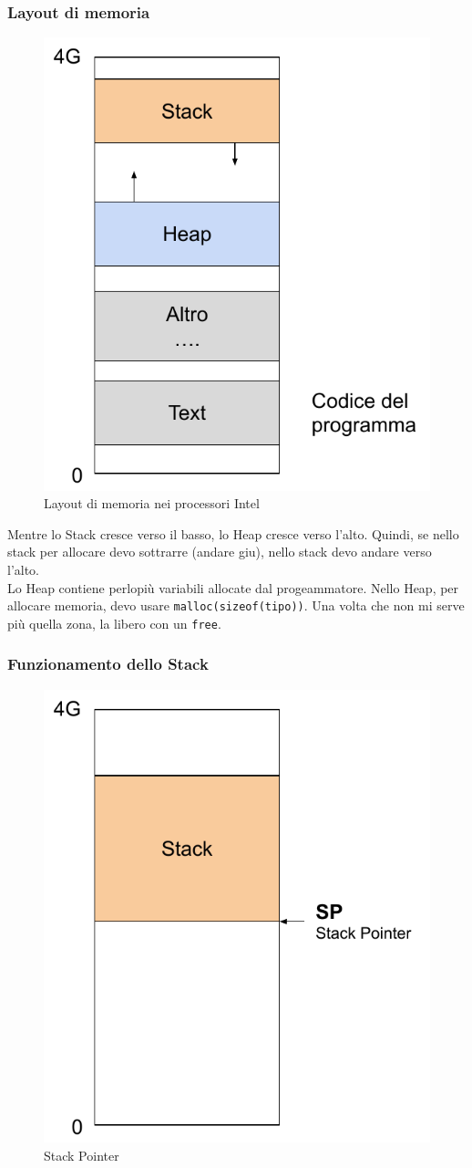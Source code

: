 \documentclass[a4paper,12pt]{article}
\begin{document}
\subsubsection{Layout di memoria}

\begin{figure}[H]
	\centering
	\includegraphics[width=0.5\linewidth]{Immagini/Stack1.pdf}
	\caption{Layout di memoria nei processori Intel}
\end{figure}

Mentre lo Stack cresce verso il basso, lo Heap cresce verso l'alto. Quindi, se nello stack per allocare devo sottrarre (andare giu), nello stack devo andare verso l'alto.\\
Lo Heap contiene perlopiù variabili allocate dal progeammatore. Nello Heap, per allocare memoria, devo usare \texttt{malloc(sizeof(tipo))}. Una volta che non mi serve più quella zona, la libero con un \texttt{free}.

\subsubsection{Funzionamento dello Stack}

\begin{figure}[H]
	\centering
	\includegraphics[width=0.5\linewidth]{Immagini/Stack2.pdf}
	\caption{Stack Pointer}
\end{figure}
\end{document}
